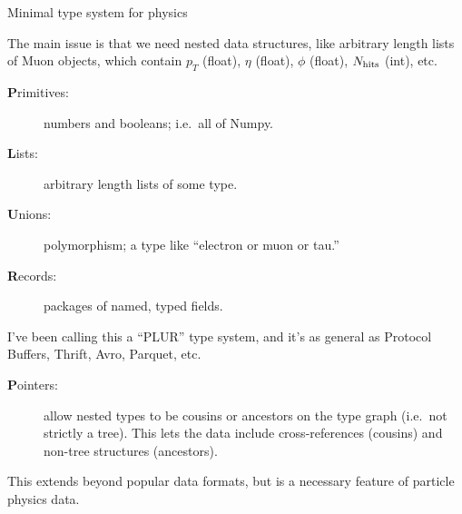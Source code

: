 \documentclass[aspectratio=169]{beamer}
\begin{document}
\begin{frame}{Minimal type system for physics}
\vspace{0.5 cm}

The main issue is that we need nested data structures, like arbitrary length lists of Muon objects, which contain $p_T$ (float), $\eta$ (float), $\phi$ (float), $N_{\mbox{\scriptsize hits}}$ (int), etc.

\large
\begin{description}
\item[{\bf P}rimitives:] numbers and booleans; i.e.\ all of Numpy.

\item[{\bf L}ists:] arbitrary length lists of some type.

\item[{\bf U}nions:] polymorphism; a type like ``electron or muon or tau.''

\item[{\bf R}ecords:] packages of named, typed fields.
\end{description}

\normalsize I've been calling this a ``PLUR'' type system, and it's as general as Protocol Buffers, Thrift, Avro, Parquet, etc.

\large
\begin{description}
\item[{\bf P}ointers:] allow nested types to be cousins or ancestors on the type graph (i.e.\ not strictly a tree). This lets the data include cross-references (cousins) and non-tree structures (ancestors).
\end{description}

\normalsize This extends beyond popular data formats, but is a necessary feature of particle physics data.
\end{frame}
\end{document}

